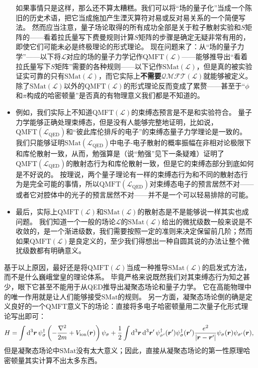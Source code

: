 \documentclass[hyperref, UTF8, a4paper]{ctexbook}
\renewcommand{\emph}{\textbf}
\newcommand{\soliddoc}{\href{../solid/solid}{固体物理笔记}}
\begin{document}
\begin{itemize}
    如果事情只是这样，那么还不算太糟糕。我们可以将“场的量子化”当成一个陈旧的历史术语，把它当成施加产生湮灭算符对易或反对易关系的一个简便写法。
    然而应当注意，量子场论取得的所有成功全部是关于粒子散射实验和$S$矩阵的——看着拉氏量写下费曼规则计算$S$矩阵的步骤是确定无疑非常有用的，即使它们可能未必是终极理论的形式理论。
    现在问题来了：从“场的量子力学”——以下将$\mathcal{L}$对应的场的量子力学记作$\mathrm{QMFT}(\mathcal{L})$——能够推导出“看着拉氏量写下$S$矩阵”需要的各种规则——以下记作$\mathrm{SMat}(\mathcal{L})$，但是真的被实验证实可靠的只有$\mathrm{SMat}(\mathcal{L})$，而它实际上\emph{不需要}$\mathcal{QMFT}(\mathcal{L})$就能够被定义。
    除了$\mathrm{SMat}(\mathcal{L})$以外的$\mathrm{QMFT}(\mathcal{L})$的形式理论反而变成了累赘——甚至于“$\phi$和$\pi$构成的哈密顿量”是否真的有物理意义我们都是不知道的。
    \item 例如，我们实际上不知道$\mathrm{QMFT}(\mathcal{L})$的束缚态预言是不是和实验符合。
    量子力学能够正确处理束缚态，但是没有人能够完整地证明，比如说，$\mathrm{QMFT}(\mathcal{L}_\text{QED})$和“彼此库伦排斥的电子”的束缚态量子力学理论是一致的。
    我们只能够证明$\mathrm{SMat}(\mathcal{L}_\text{QED})$中电子-电子散射的概率振幅在非相对论极限下和库伦散射一致，从而，勉强算是（说“勉强”见下一条疑难）证明了$\mathrm{QMFT}(\mathcal{L}_\text{QED})$的散射态行为和库伦散射一致，但是它的束缚态部分到底如何是不好说的。
    按理说，两个量子理论有一样的束缚态行为和不同的散射态行为是完全可能的事情，所以$\mathrm{QMFT}(\mathcal{L}_\text{QED})$对束缚态电子的预言居然不对——或者它对腔体中的光子的预言居然不对——并不是一个可以轻易排除的可能。
    \item 最后，实际上$\mathrm{QMFT}(\mathcal{L})$和$\mathrm{SMat}(\mathcal{L})$的散射态是不是能够说一样其实也成问题。
    我们知道一个一般的场论$\mathcal{L}$的$\mathrm{SMat}(\mathcal{L})$给出的微扰级数一般来说是不收敛的，是一个渐进级数，我们需要按照一定的准则来决定保留前几阶；然而如果$\mathrm{QMFT}(\mathcal{L})$是良定义的，至少我们得想出一种自圆其说的办法让整个微扰级数都有明确意义。
\end{itemize}

基于以上原因，最好还是将$\mathrm{QMFT}(\mathcal{L})$当成一种推导$\mathrm{SMat}(\mathcal{L})$的启发式方法，而不是什么巍峨堂皇的理论体系。
毕竟严格来说既然我们对其束缚态行为知之甚少，眼下它甚至不能用于从QED推导出凝聚态场论和量子力学。
它在高能物理中的唯一作用就是让人们能够接受$\mathrm{SMat}$的规则。
另一方面，凝聚态场论倒的确是定义良好的一个$\mathrm{QMFT}$意义下的场论：直接将多电子哈密顿量用二次量子化形式理论写出即可：
\begin{equation}
H = \int \dd[3]{\vb*{r}} \psi^\dagger_\sigma \left( - \frac{\laplacian}{2m} + V_\text{ion}(\vb*{r}) \right) \psi_\sigma + \frac{1}{2} \int \dd[3]{\vb*{r}} \dd[3]{\vb*{r}'} \psi^\dagger_{\sigma'}(\vb*{r}') \psi^\dagger_\sigma(\vb*{r}') \frac{e^2}{\abs{\vb*{r} - \vb*{r}'}} \psi_\sigma(\vb*{r}) \psi_{\sigma'}(\vb*{r}),
\label{eq:condense-qft}
\end{equation}
但是凝聚态场论中$\mathrm{SMat}$没有太大意义；因此，直接从凝聚态场论的第一性原理哈密顿量其实计算不出太多东西。
\end{document}
